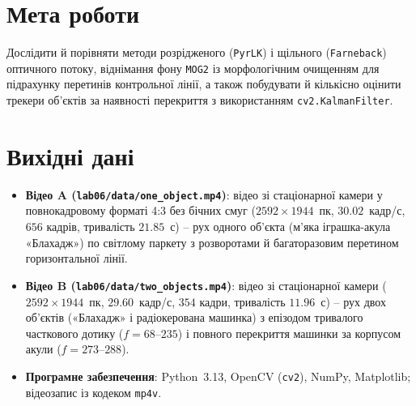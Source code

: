 \documentclass[14pt, a4paper]{extarticle}
\begin{document}


\section{Мета роботи}
Дослідити й порівняти методи розрідженого (\texttt{PyrLK}) і щільного (\texttt{Farneback}) оптичного потоку, віднімання фону \texttt{MOG2} із морфологічним очищенням для підрахунку перетинів контрольної лінії, а також побудувати й кількісно оцінити трекери об'єктів за наявності перекриття з використанням \texttt{cv2.KalmanFilter}.

\section{Вихідні дані}
\begin{itemize}
    \item \textbf{Відео A (\texttt{lab06/data/one\_object.mp4})}: відео зі стаціонарної камери у повнокадровому форматі 4:3 без бічних смуг ($2592 \times 1944$~пк, $30.02$~кадр/с, $656$ кадрів, тривалість $21.85$~с) -- рух одного об'єкта (м'яка іграшка-акула «Блахадж») по світлому паркету з розворотами й багаторазовим перетином горизонтальної лінії.
    \item \textbf{Відео B (\texttt{lab06/data/two\_objects.mp4})}: відео зі стаціонарної камери ($2592 \times 1944$~пк, $29.60$~кадр/с, $354$ кадри, тривалість $11.96$~с) -- рух двох об'єктів («Блахадж» і радіокерована машинка) з епізодом тривалого часткового дотику ($f = 68$--$235$) і повного перекриття машинки за корпусом акули ($f = 273$--$288$).
    \item \textbf{Програмне забезпечення}: Python~3.13, OpenCV (\texttt{cv2}), NumPy, Matplotlib; відеозапис із кодеком \texttt{mp4v}.
\end{itemize}
\end{document}
